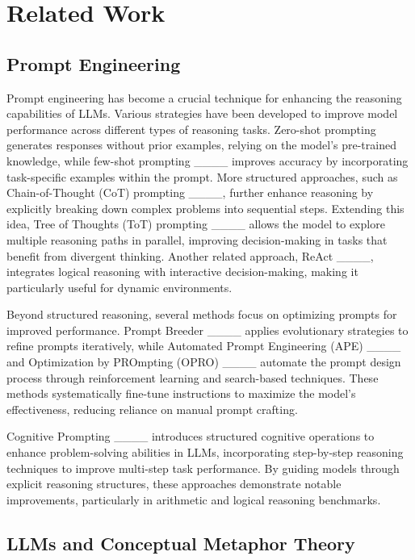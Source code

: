 \section{Related Work}
\label{sec:related}

\subsection{Prompt Engineering}

Prompt engineering has become a crucial technique for enhancing the reasoning capabilities of LLMs. Various strategies have been developed to improve model performance across different types of reasoning tasks. Zero-shot prompting generates responses without prior examples, relying on the model’s pre-trained knowledge, while few-shot prompting ____ improves accuracy by incorporating task-specific examples within the prompt. More structured approaches, such as Chain-of-Thought (CoT) prompting ____, further enhance reasoning by explicitly breaking down complex problems into sequential steps. Extending this idea, Tree of Thoughts (ToT) prompting ____ allows the model to explore multiple reasoning paths in parallel, improving decision-making in tasks that benefit from divergent thinking. Another related approach, ReAct ____, integrates logical reasoning with interactive decision-making, making it particularly useful for dynamic environments.

Beyond structured reasoning, several methods focus on optimizing prompts for improved performance. Prompt Breeder ____ applies evolutionary strategies to refine prompts iteratively, while Automated Prompt Engineering (APE) ____ and Optimization by PROmpting (OPRO) ____ automate the prompt design process through reinforcement learning and search-based techniques. These methods systematically fine-tune instructions to maximize the model's effectiveness, reducing reliance on manual prompt crafting. 

Cognitive Prompting ____ introduces structured cognitive operations to enhance problem-solving abilities in LLMs, incorporating step-by-step reasoning techniques to improve multi-step task performance. By guiding models through explicit reasoning structures, these approaches demonstrate notable improvements, particularly in arithmetic and logical reasoning benchmarks.
 
\subsection{LLMs and Conceptual Metaphor Theory}

